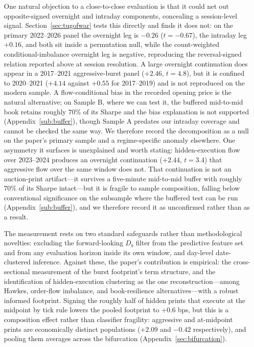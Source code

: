 \documentclass[11pt]{article}
\begin{document}
One natural objection to a close-to-close evaluation is that it could net out opposite-signed overnight and intraday components, concealing a session-level signal. Section~\ref{sec:tugofwar} tests this directly and finds it does not: on the primary 2022--2026 panel the overnight leg is $-0.26$ ($t=-0.67$), the intraday leg $+0.16$, and both sit inside a permutation null, while the count-weighted conditional-imbalance overnight leg is negative, reproducing the reversal-signed relation reported above at session resolution. A large overnight continuation does appear in a 2017--2021 aggressive-burst panel ($+2.46$, $t=4.8$), but it is confined to 2020--2021 ($+4.14$ against $+0.55$ for 2017--2019) and is not reproduced on the modern sample. A flow-conditional bias in the recorded opening price is the natural alternative; on Sample B, where we can test it, the buffered mid-to-mid book retains roughly $70\%$ of its Sharpe and the bias explanation is not supported (Appendix~\ref{sub:buffer}), though Sample A predates our intraday coverage and cannot be checked the same way. We therefore record the decomposition as a null on the paper's primary sample and a regime-specific anomaly elsewhere. One asymmetry it surfaces is unexplained and worth stating: hidden-execution flow over 2023--2024 produces an overnight continuation ($+2.44$, $t=3.4$) that aggressive flow over the same window does not. That continuation is not an auction-print artifact---it survives a five-minute mid-to-mid buffer with roughly $70\%$ of its Sharpe intact---but it is fragile to sample composition, falling below conventional significance on the subsample where the buffered test can be run (Appendix~\ref{sub:buffer}), and we therefore record it as unconfirmed rather than as a result.

The measurement rests on two standard safeguards rather than methodological novelties: excluding the forward-looking $D_b$ filter from the predictive feature set and from any evaluation horizon inside its own window, and day-level date-clustered inference. Against these, the paper's contribution is empirical: the cross-sectional measurement of the burst footprint's term structure, and the identification of hidden-execution clustering as the one reconstruction---among Hawkes, order-flow imbalance, and book-resilience alternatives---with a robust informed footprint. Signing the roughly half of hidden prints that execute at the midpoint by tick rule lowers the pooled footprint to $+0.6$ bps, but this is a composition effect rather than classifier fragility: aggressive and at-midpoint prints are economically distinct populations ($+2.09$ and $-0.42$ respectively), and pooling them averages across the bifurcation (Appendix~\ref{sec:bifurcation}).
\end{document}
